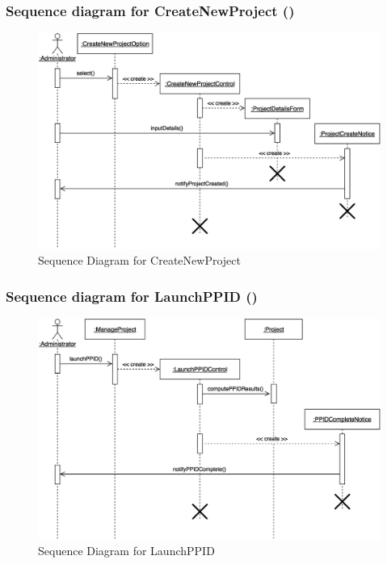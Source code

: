 \documentclass[12pt,letterpaper]{article}
\begin{document}
\subsubsection*{Sequence diagram for CreateNewProject (\createnewproject{})}

\begin{figure}[H]
	\centering{}
	\includegraphics[scale=0.3]{imgs/seq/create-new-project.png}
	\caption{Sequence Diagram for CreateNewProject}
\end{figure}

\subsubsection*{Sequence diagram for LaunchPPID (\launchppid{})}

\begin{figure}[H]
	\centering{}
	\includegraphics[scale=0.3]{imgs/seq/launch-ppid.png}
	\caption{Sequence Diagram for LaunchPPID}
\end{figure}
\end{document}
